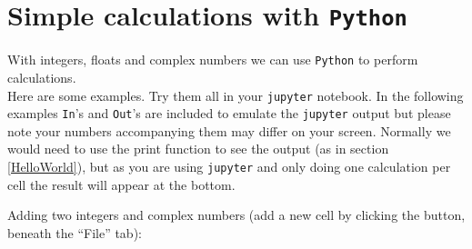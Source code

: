 \section{Simple calculations with \texttt{Python}}
\label{calculations}
\noindent With integers, floats and complex numbers we can use \texttt{Python} to perform calculations.\\
\noindent Here are some examples. Try them all in your {\tt jupyter} notebook. In the following examples {\tt In}'s and  {\tt Out}'s are included to emulate the {\tt jupyter} output but please note your numbers accompanying them may differ on your screen. 
\noindent Normally we would need to use the print function to see the output (as in section \ref{HelloWorld}), but as you are using {\tt jupyter} and only doing one calculation per cell the result will appear at the bottom.
\vspace*{2ex}

\noindent Adding two integers and complex numbers (add a new cell by clicking the \keys{{+}} button, beneath the ``File'' tab):

